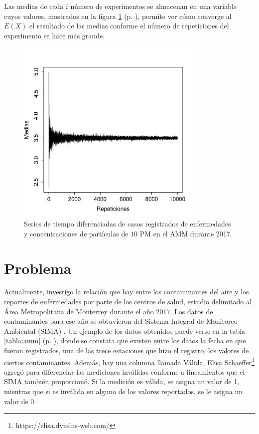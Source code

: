 \documentclass[paper=leter, fontsize=11pt]{scrartcl}
\begin{document}
Las medias de cada $i$ número de experimentos se almacenan en una variable cuyos valores, mostrados en la figura \ref{fig:dados} (p. \pageref{fig:dados}), permite ver cómo converge al $E(X)$ el resultado de las medias conforme el número de repeticiones del experimento se hace más grande.

\begin{figure}
  \centering
  \includegraphics[width=0.8\textwidth]{dados.pdf}
\caption{Series de tiempo diferenciadas de casos registrados de enfermedades y concentraciones de partículas de $10$ PM en el AMM durante 2017.}
\label{fig:dados}
\end{figure}

\section{Problema}

Actualmente, investigo la relación que hay entre los contaminantes del aire y los reportes de enfermedades por parte de los centros de salud, estudio delimitado al Área Metropolitana de Monterrey durante el año 2017. Los datos de contaminantes para ese año se obtuvieron del Sistema Integral de Monitoreo Ambiental (SIMA) \cite{aireNL}. Un ejemplo de los datos obtenidos puede verse en la tabla \ref{tabla:amm} (p. \pageref{tabla:amm}), donde se constata que existen entre los datos la fecha en que fueron registrados, una de las trece estaciones que hizo el registro, los valores de ciertos contaminantes. Además, hay una columna llamada Válida, Elisa Schaeffer\footnote{https://elisa.dyndns-web.com/} agregó para diferenciar las mediciones inválidas conforme a lineamientos que el SIMA también proporcionó. Si la medición es válida, se asigna un valor de 1, mientras que si es inválida en alguno de los valores reportados, se le asigna un valor de 0.
\end{document}
